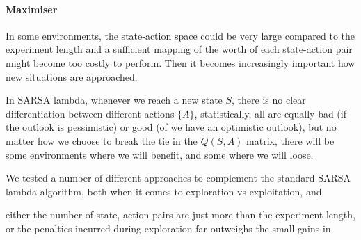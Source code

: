\paragraph{Maximiser}
In some environments, the state-action space could be very large compared to the experiment length and a sufficient mapping of the worth of each state-action pair might become too costly to perform. Then it becomes increasingly important how new situations are approached. 

In SARSA lambda, whenever we reach a new state $S$, there is no clear differentiation between different actions $\{A\}$, statistically, all are equally bad (if the outlook is pessimistic) or good (of we have an optimistic outlook), but no matter how we choose to break the tie in the $Q(S,A)$ matrix, there will be some environments where we will benefit, and some where we will loose.

We tested a number of different approaches to complement the standard SARSA lambda algorithm, both when it comes to exploration vs exploitation, and 


either the number of state, action pairs are just more than the experiment length, or the penalties incurred during exploration far outweighs the small gains in 
